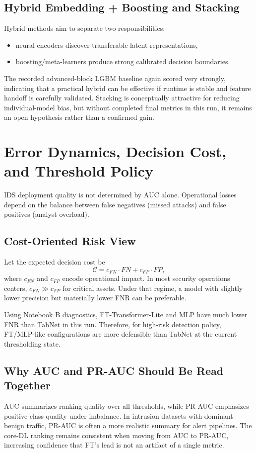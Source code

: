 \documentclass[10pt,journal]{IEEEtran}
\begin{document}
\subsection{Hybrid Embedding + Boosting and Stacking}
Hybrid methods aim to separate two responsibilities:
\begin{itemize}
\item neural encoders discover transferable latent representations,
\item boosting/meta-learners produce strong calibrated decision boundaries.
\end{itemize}
The recorded advanced-block LGBM baseline again scored very strongly, indicating that a practical hybrid can be effective if runtime is stable and feature handoff is carefully validated. Stacking is conceptually attractive for reducing individual-model bias, but without completed final metrics in this run, it remains an open hypothesis rather than a confirmed gain.

\section{Error Dynamics, Decision Cost, and Threshold Policy}
IDS deployment quality is not determined by AUC alone. Operational losses depend on the balance between false negatives (missed attacks) and false positives (analyst overload).

\subsection{Cost-Oriented Risk View}
Let the expected decision cost be
\begin{equation}
\mathcal{C} = c_{FN}\cdot FN + c_{FP}\cdot FP,
\end{equation}
where $c_{FN}$ and $c_{FP}$ encode operational impact. In most security operations centers, $c_{FN} \gg c_{FP}$ for critical assets. Under that regime, a model with slightly lower precision but materially lower FNR can be preferable.

Using Notebook B diagnostics, FT-Transformer-Lite and MLP have much lower FNR than TabNet in this run. Therefore, for high-risk detection policy, FT/MLP-like configurations are more defensible than TabNet at the current thresholding state.

\subsection{Why AUC and PR-AUC Should Be Read Together}
AUC summarizes ranking quality over all thresholds, while PR-AUC emphasizes positive-class quality under imbalance. In intrusion datasets with dominant benign traffic, PR-AUC is often a more realistic summary for alert pipelines. The core-DL ranking remains consistent when moving from AUC to PR-AUC, increasing confidence that FT's lead is not an artifact of a single metric.
\end{document}
